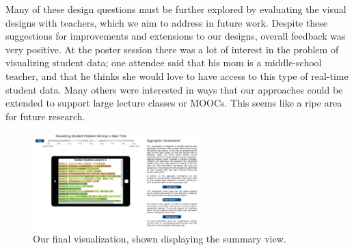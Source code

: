 \documentclass{sigchi}
\begin{document}
Many of these design questions must be further explored by evaluating the visual designs with teachers, which we aim to address in future work. Despite these suggestions for improvements and extensions to our designs, overall feedback was very positive. At the poster session there was a lot of interest in the problem of visualizing student data; one attendee said that his mom is a middle-school teacher, and that he thinks she would love to have access to this type of real-time student data. Many others were interested in ways that our approaches could be extended to support large lecture classes or MOOCs. This seems like a ripe area for future research.




\begin{figure}[t]
\centering
\includegraphics[width=65mm]{images/results1.pdf}
\caption{Our final visualization, shown displaying the summary view.}
\label{fig:Website}
\end{figure}
\end{document}
